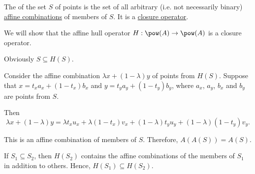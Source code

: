 \begin{definition}\label{def:affine_hull}\mimprovised
  The  of the set \( S \) of points is the set of all arbitrary (i.e. not necessarily binary) \hyperref[def:affine_combinations]{affine combinations} of members of \( S \). It is a \hyperref[def:abstract_closure_operator]{closure operator}.
\end{definition}
\begin{defproof}
  We will show that the affine hull operator \( H: \pow(A) \to \pow(A) \) is a closure operator.

   Obviously \( S \subseteq H(S) \).

   Consider the affine combination \( \lambda x + (1 - \lambda) y \) of points from \( H(S) \). Suppose that \( x = t_x a_x + (1 - t_x) b_x \) and \( y = t_y a_y + (1 - t_y) b_y \), where \( a_x \), \( a_y \), \( b_x \) and \( b_y \) are points from \( S \).

  Then
  \begin{equation*}
    \lambda x + (1 - \lambda) y
    =
    \lambda t_x u_x + \lambda (1 - t_x) v_x + (1 - \lambda) t_y u_y + (1 - \lambda) (1 - t_y) v_y.
  \end{equation*}

  This is an affine combination of members of \( S \). Therefore, \( A(A(S)) = A(S) \).

   If \( S_1 \subseteq S_2 \), then \( H(S_2) \) contains the affine combinations of the members of \( S_1 \) in addition to others. Hence, \( H(S_1) \subseteq H(S_2) \).
\end{defproof}

